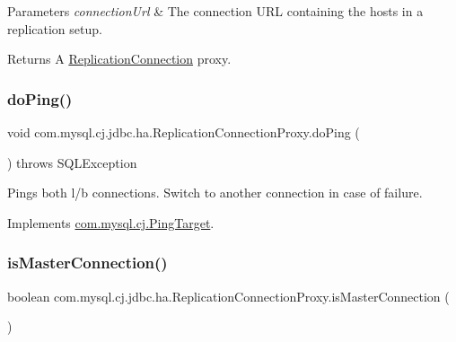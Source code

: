 \begin{DoxyParams}{Parameters}
{\em connection\+Url} & The connection U\+RL containing the hosts in a replication setup. \\
\hline
\end{DoxyParams}
\begin{DoxyReturn}{Returns}
A \mbox{\hyperlink{interfacecom_1_1mysql_1_1cj_1_1jdbc_1_1ha_1_1_replication_connection}{Replication\+Connection}} proxy. 
\end{DoxyReturn}
\mbox{\label{classcom_1_1mysql_1_1cj_1_1jdbc_1_1ha_1_1_replication_connection_proxy_ae2c2446c646d5bc28578f3f35695ef45}} 
\subsubsection{\texorpdfstring{do\+Ping()}{doPing()}}
{\footnotesize\ttfamily void com.\+mysql.\+cj.\+jdbc.\+ha.\+Replication\+Connection\+Proxy.\+do\+Ping (\begin{DoxyParamCaption}{ }\end{DoxyParamCaption}) throws S\+Q\+L\+Exception}

Pings both l/b connections. Switch to another connection in case of failure. 

Implements \mbox{\hyperlink{interfacecom_1_1mysql_1_1cj_1_1_ping_target}{com.\+mysql.\+cj.\+Ping\+Target}}.

\mbox{\label{classcom_1_1mysql_1_1cj_1_1jdbc_1_1ha_1_1_replication_connection_proxy_ad8c04913b78285025c503997f66cfd59}} 
\subsubsection{\texorpdfstring{is\+Master\+Connection()}{isMasterConnection()}}
{\footnotesize\ttfamily boolean com.\+mysql.\+cj.\+jdbc.\+ha.\+Replication\+Connection\+Proxy.\+is\+Master\+Connection (\begin{DoxyParamCaption}{ }\end{DoxyParamCaption})}

